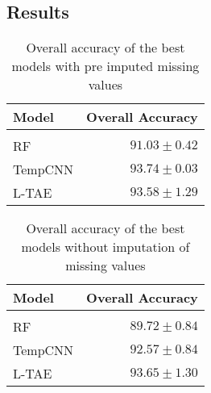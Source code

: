 \subsection{Results}

\begin{table}[!htbp]
  \centering
    \begin{tabular}{lr}
    Model                       & Overall Accuracy             \\[0.2cm] 
    \hline \\[-0.2cm]
    RF      & $91.03 \pm 0.42$\\
    TempCNN & $93.74 \pm 0.03$\\
    L-TAE   & $93.58 \pm 1.29$
    \end{tabular}
  \caption{Overall accuracy of the best models with pre imputed missing values} 
\end{table}

\begin{table}[!htbp]
  \centering
    \begin{tabular}{lr}
    Model                       & Overall Accuracy             \\[0.2cm] 
    \hline \\[-0.2cm]
    RF      & $89.72 \pm 0.84$\\
    TempCNN & $92.57 \pm 0.84$\\
    L-TAE   & $93.65 \pm 1.30$
    \end{tabular}
  \caption{Overall accuracy of the best models without imputation of missing values} 
\end{table}